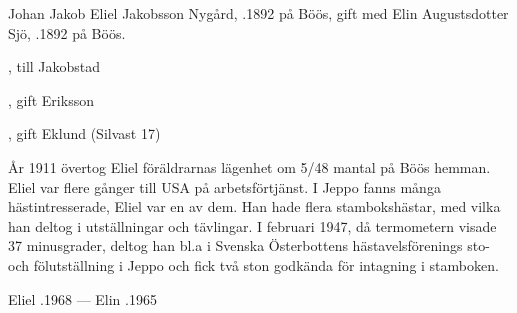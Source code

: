 Johan Jakob Eliel Jakobsson Nygård, .1892 på Böös, gift med Elin Augustsdotter Sjö, .1892 på Böös.
\begin{jhchildren}
  \item {}
  \item {}
  \item {}
  \item {}, till Jakobstad
  \item {}, gift Eriksson
  \item {}
  \item {}, gift Eklund (Silvast 17)
\end{jhchildren}
År 1911 övertog Eliel föräldrarnas lägenhet om 5/48 mantal på Böös hemman. Eliel var flere gånger till USA på arbetsförtjänst. I Jeppo fanns många hästintresserade, Eliel var en av dem. Han hade flera stambokshästar, med vilka han deltog i utställningar och tävlingar. I februari 1947, då termometern visade 37 minusgrader, deltog han bl.a i Svenska Österbottens hästavelsförenings sto- och fölutställning i Jeppo och fick två ston godkända för intagning  i stamboken.

Eliel .1968  ---  Elin .1965


